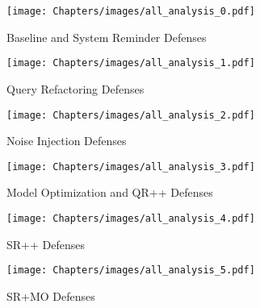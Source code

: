 \begin{figure*}[htbp]
    \centering
    \begin{subfigure}[b]{0.87\textwidth}
        \centering
        \texttt{[image: Chapters/images/all\_analysis\_0.pdf]}
        \captionsetup{aboveskip=1pt} 
        \caption{Baseline and System Reminder Defenses }
        \label{fig:subfig1}
    \end{subfigure}
    \vspace{0.2cm} 
    \begin{subfigure}[b]{0.87\textwidth}
        \centering
        \texttt{[image: Chapters/images/all\_analysis\_1.pdf]}
        \captionsetup{aboveskip=1pt} 
        \caption{Query Refactoring Defenses}
        \label{fig:subfig2}
    \end{subfigure}
    \vspace{0.2cm} 
    \begin{subfigure}[b]{0.87\textwidth}
        \centering
        \texttt{[image: Chapters/images/all\_analysis\_2.pdf]}
        \captionsetup{aboveskip=1pt} 
        \caption{Noise Injection Defenses}
        \label{fig:subfig3}
    \end{subfigure}
    \vspace{0.2cm} 
    \begin{subfigure}[b]{0.87\textwidth}
        \centering
        \texttt{[image: Chapters/images/all\_analysis\_3.pdf]}
        \captionsetup{aboveskip=1pt} 
        \caption{Model Optimization and QR++ Defenses}
        \label{fig:subfig2}
    \end{subfigure}
    \vspace{0.2cm} 
    \begin{subfigure}[b]{0.87\textwidth}
        \centering
        \texttt{[image: Chapters/images/all\_analysis\_4.pdf]}
        \captionsetup{aboveskip=1pt} 
        \caption{SR++ Defenses}
        \label{fig:subfig2}
    \end{subfigure}
    \vspace{0.2cm} 
    \begin{subfigure}[b]{0.87\textwidth}
        \centering
        \texttt{[image: Chapters/images/all\_analysis\_5.pdf]}
        \captionsetup{aboveskip=1pt} 
        \caption{SR+MO Defenses}
        \label{fig:subfig2}
    \end{subfigure}
    \vspace{0.2cm} 
    \begin{subfigure}[b]{0.87\textwidth}

\end{subfigure}
\end{figure*}
